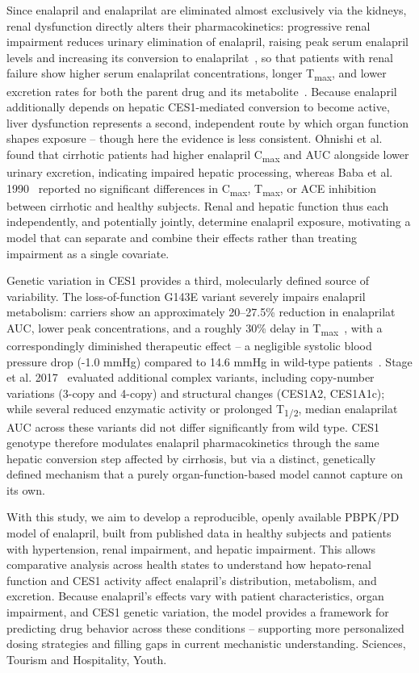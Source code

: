 \documentclass[pharmaceutics,article,submit,pdftex,moreauthors]{Definitions/mdpi}
\begin{document}
Since enalapril and enalaprilat are eliminated almost exclusively via the kidneys, renal dysfunction directly alters their pharmacokinetics: progressive renal impairment reduces urinary elimination of enalapril, raising peak serum enalapril levels and increasing its conversion to enalaprilat~\cite{Fruncillo1987}, so that patients with renal failure show higher serum enalaprilat concentrations, longer T\textsubscript{max}, and lower excretion rates for both the parent drug and its metabolite~\cite{Kelly1986, Lowenthal1985}. Because enalapril additionally depends on hepatic CES1-mediated conversion to become active, liver dysfunction represents a second, independent route by which organ function shapes exposure -- though here the evidence is less consistent. Ohnishi et al.~\cite{Ohnishi1989} found that cirrhotic patients had higher enalapril C\textsubscript{max} and AUC alongside lower urinary excretion, indicating impaired hepatic processing, whereas Baba et al. 1990~\cite{Baba1990} reported no significant differences in C\textsubscript{max}, T\textsubscript{max}, or ACE inhibition between cirrhotic and healthy subjects. Renal and hepatic function thus each independently, and potentially jointly, determine enalapril exposure, motivating a model that can separate and combine their effects rather than treating impairment as a single covariate.

Genetic variation in CES1 provides a third, molecularly defined source of variability. The loss-of-function G143E variant severely impairs enalapril metabolism: carriers show an approximately 20--27.5\% reduction in enalaprilat AUC, lower peak concentrations, and a roughly 30\% delay in T\textsubscript{max}~\cite{Her2021, Tarkiainen2015}, with a correspondingly diminished therapeutic effect -- a negligible systolic blood pressure drop (-1.0 mmHg) compared to 14.6 mmHg in wild-type patients~\cite{Her2021}. Stage et al. 2017~\cite{Stage2017} evaluated additional complex variants, including copy-number variations (3-copy and 4-copy) and structural changes (CES1A2, CES1A1c); while several reduced enzymatic activity or prolonged T\textsubscript{1/2}, median enalaprilat AUC across these variants did not differ significantly from wild type. CES1 genotype therefore modulates enalapril pharmacokinetics through the same hepatic conversion step affected by cirrhosis, but via a distinct, genetically defined mechanism that a purely organ-function-based model cannot capture on its own.

With this study, we aim to develop a reproducible, openly available PBPK/PD model of enalapril, built from published data in healthy subjects and patients with hypertension, renal impairment, and hepatic impairment. This allows comparative analysis across health states to understand how hepato-renal function and CES1 activity affect enalapril's distribution, metabolism, and excretion. Because enalapril's effects vary with patient characteristics, organ impairment, and CES1 genetic variation, the model provides a framework for predicting drug behavior across these conditions -- supporting more personalized dosing strategies and filling gaps in current mechanistic understanding. Sciences, Tourism and Hospitality, Youth. 
\end{document}
